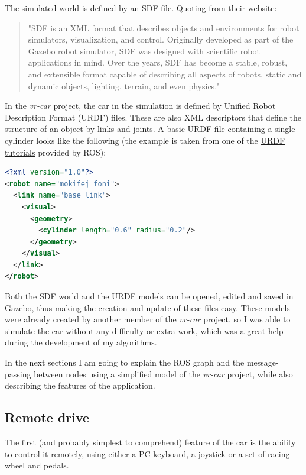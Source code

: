 The simulated world is defined by an SDF file. Quoting from their \href{http://sdformat.org}{website}:

\begin{quote}
"SDF is an XML format that describes objects and environments for robot simulators, visualization, and control. Originally developed as part of the Gazebo robot simulator, SDF was designed with scientific robot applications in mind. Over the years, SDF has become a stable, robust, and extensible format capable of describing all aspects of robots, static and dynamic objects, lighting, terrain, and even physics."
\end{quote}

In the \textit{vr-car} project, the car in the simulation is defined by Unified Robot Description Format (URDF) files. These are also XML descriptors that define the structure of an object by links and joints. A basic URDF file containing a single cylinder looks like the following (the example is taken from one of the \href{http://wiki.ros.org/urdf/Tutorials}{URDF tutorials} provided by ROS):

\begin{minipage}{\textwidth}
\begin{lstlisting}[language=XML]
<?xml version="1.0"?>
<robot name="mokifej_foni">
  <link name="base_link">
    <visual>
      <geometry>
        <cylinder length="0.6" radius="0.2"/>
      </geometry>
    </visual>
  </link>
</robot>
\end{lstlisting}
\end{minipage}

Both the SDF world and the URDF models can be opened, edited and saved in Gazebo, thus making the creation and update of these files easy. These models were already created by another member of the \textit{vr-car} project, so I was able to simulate the car without any difficulty or extra work, which was a great help during the development of my algorithms.

In the next sections I am going to explain the ROS graph and the message-passing between nodes using a simplified model of the \textit{vr-car} project, while also describing the features of the application.

\subsection{Remote drive}
The first (and probably simplest to comprehend) feature of the car is the ability to control it remotely, using either a PC keyboard, a joystick or a set of racing wheel and pedals.


